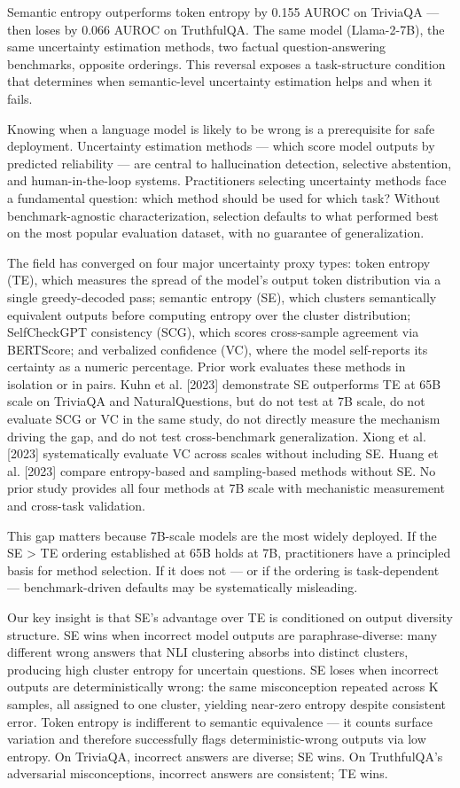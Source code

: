 
Semantic entropy outperforms token entropy by 0.155 AUROC on TriviaQA --- then loses by 0.066 AUROC on TruthfulQA. The same model (Llama-2-7B), the same uncertainty estimation methods, two factual question-answering benchmarks, opposite orderings. This reversal exposes a task-structure condition that determines when semantic-level uncertainty estimation helps and when it fails.

Knowing when a language model is likely to be wrong is a prerequisite for safe deployment. Uncertainty estimation methods --- which score model outputs by predicted reliability --- are central to hallucination detection, selective abstention, and human-in-the-loop systems. Practitioners selecting uncertainty methods face a fundamental question: which method should be used for which task? Without benchmark-agnostic characterization, selection defaults to what performed best on the most popular evaluation dataset, with no guarantee of generalization.

The field has converged on four major uncertainty proxy types: token entropy (TE), which measures the spread of the model's output token distribution via a single greedy-decoded pass; semantic entropy (SE), which clusters semantically equivalent outputs before computing entropy over the cluster distribution; SelfCheckGPT consistency (SCG), which scores cross-sample agreement via BERTScore; and verbalized confidence (VC), where the model self-reports its certainty as a numeric percentage. Prior work evaluates these methods in isolation or in pairs. Kuhn et al. [2023] demonstrate SE outperforms TE at 65B scale on TriviaQA and NaturalQuestions, but do not test at 7B scale, do not evaluate SCG or VC in the same study, do not directly measure the mechanism driving the gap, and do not test cross-benchmark generalization. Xiong et al. [2023] systematically evaluate VC across scales without including SE. Huang et al. [2023] compare entropy-based and sampling-based methods without SE. No prior study provides all four methods at 7B scale with mechanistic measurement and cross-task validation.

This gap matters because 7B-scale models are the most widely deployed. If the SE > TE ordering established at 65B holds at 7B, practitioners have a principled basis for method selection. If it does not --- or if the ordering is task-dependent --- benchmark-driven defaults may be systematically misleading.

Our key insight is that SE's advantage over TE is conditioned on output diversity structure. SE wins when incorrect model outputs are paraphrase-diverse: many different wrong answers that NLI clustering absorbs into distinct clusters, producing high cluster entropy for uncertain questions. SE loses when incorrect outputs are deterministically wrong: the same misconception repeated across K samples, all assigned to one cluster, yielding near-zero entropy despite consistent error. Token entropy is indifferent to semantic equivalence --- it counts surface variation and therefore successfully flags deterministic-wrong outputs via low entropy. On TriviaQA, incorrect answers are diverse; SE wins. On TruthfulQA's adversarial misconceptions, incorrect answers are consistent; TE wins.

